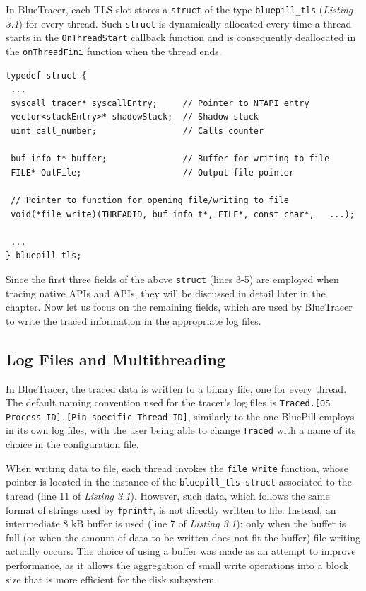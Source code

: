 In BlueTracer, each TLS slot stores a \texttt{struct} of the type \texttt{bluepill\_tls} (\textit{Listing 3.1}) for every thread. Such \texttt{struct} is dynamically allocated every time a thread starts in the \texttt{OnThreadStart} callback function and is consequently deallocated in the \texttt{onThreadFini} function when the thread ends.

\vspace{0.5cm}
\begin{lstlisting}[caption={Thread Local Data},captionpos=b]
typedef struct {
 ...
 syscall_tracer* syscallEntry;     // Pointer to NTAPI entry
 vector<stackEntry>* shadowStack;  // Shadow stack
 uint call_number;             	   // Calls counter							
 
 buf_info_t* buffer;		   	   // Buffer for writing to file				 
 FILE* OutFile;                    // Output file pointer
 
 // Pointer to function for opening file/writing to file	
 void(*file_write)(THREADID, buf_info_t*, FILE*, const char*, 	...);
 
 ...
} bluepill_tls;
\end{lstlisting}

Since the first three fields of the above \texttt{struct} (lines 3-5) are employed when tracing native APIs and APIs, they will be discussed in detail later in the chapter. Now let us focus on the remaining fields, which are used by BlueTracer to write the traced information in the appropriate log files. 

\subsection{Log Files and Multithreading}

In BlueTracer, the traced data is written to a binary file, one for every thread. The default naming convention used for the tracer's log files is \texttt{Traced.[OS Process ID].[Pin-specific Thread ID]}, similarly to the one BluePill employs in its own log files, with the user being able to change \texttt{Traced} with a name of its choice in the configuration file. 

When writing data to file, each thread invokes the \texttt{file\_write} function, whose pointer is located in the instance of the \texttt{bluepill\_tls struct} associated to the thread (line 11 of \textit{Listing 3.1}). However, such data, which follows the same format of strings used by \texttt{fprintf}, is not directly written to file. Instead, an intermediate 8 kB buffer is used (line 7 of \textit{Listing 3.1}): only when the buffer is full (or when the amount of data to be written does not fit the buffer) file writing actually occurs. The choice of using a buffer was made as an attempt to improve performance, as it allows the aggregation of small write operations into a block size that is more efficient for the disk subsystem.


